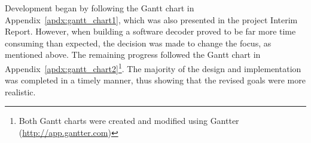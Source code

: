 	Development began by following the Gantt chart in Appendix~\ref{apdx:gantt_chart1}, which was also presented in the project Interim Report.  However, when building a software decoder proved to be far more time consuming than expected, the decision was made to change the focus, as mentioned above.  
	The remaining progress followed the Gantt chart in Appendix~\ref{apdx:gantt_chart2}\footnote{Both Gantt charts were created and modified using Gantter (\href{http://app.gantter.com}{http://app.gantter.com})}.  The majority of the design and implementation was completed in a timely manner, thus showing that the revised goals were more realistic.



